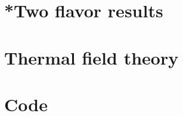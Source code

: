 \documentclass{book}
\begin{document}
    \appendix

    \chapter[Appendix A]{}
    
    
    

    \chapter{*Two flavor results}
    
    
    
    
    
    
    
    
    
    \chapter{Thermal field theory}
    \label{appendix: thermal field theory}
    
    
    
    
    
    
    
    \chapter{Code}
    

    \cleardoublepage
    \printbibliography
\end{document}
